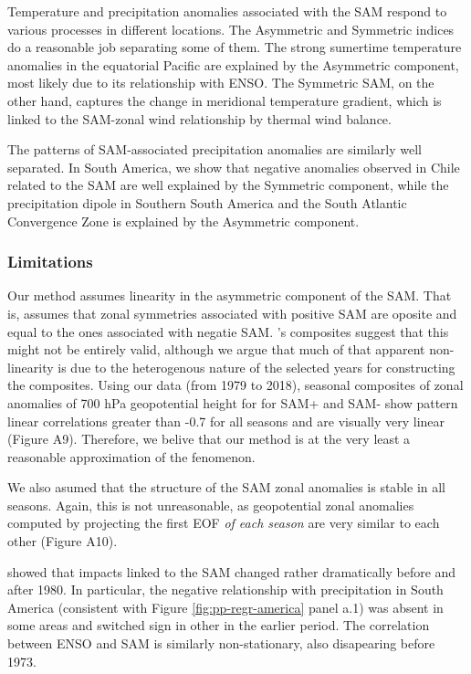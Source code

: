 \documentclass[]{ametsocV5}
\begin{document}
Temperature and precipitation anomalies associated with the SAM respond
to various processes in different locations. The Asymmetric and
Symmetric indices do a reasonable job separating some of them. The
strong sumertime temperature anomalies in the equatorial Pacific are
explained by the Asymmetric component, most likely due to its
relationship with ENSO. The Symmetric SAM, on the other hand, captures
the change in meridional temperature gradient, which is linked to the
SAM-zonal wind relationship by thermal wind balance.

The patterns of SAM-associated precipitation anomalies are similarly
well separated. In South America, we show that negative anomalies
observed in Chile related to the SAM are well explained by the Symmetric
component, while the precipitation dipole in Southern South America and
the South Atlantic Convergence Zone is explained by the Asymmetric
component.

\subsubsection*{Limitations}

Our method assumes linearity in the asymmetric component of the SAM.
That is, assumes that zonal symmetries associated with positive SAM are
oposite and equal to the ones associated with negatie SAM.
\citet{fogt2012}'s composites suggest that this might not be entirely
valid, although we argue that much of that apparent non-linearity is due
to the heterogenous nature of the selected years for constructing the
composites. Using our data (from 1979 to 2018), seasonal composites of
zonal anomalies of 700 hPa geopotential height for for SAM+ and SAM-
show pattern linear correlations greater than -0.7 for all seasons and
are visually very linear (Figure A9). Therefore, we belive that our
method is at the very least a reasonable approximation of the fenomenon.

We also asumed that the structure of the SAM zonal anomalies is stable
in all seasons. Again, this is not unreasonable, as geopotential zonal
anomalies computed by projecting the first EOF \emph{of each season} are
very similar to each other (Figure A10).

\citet{silvestri2009} showed that impacts linked to the SAM changed
rather dramatically before and after 1980. In particular, the negative
relationship with precipitation in South America (consistent with Figure
\ref{fig:pp-regr-america} panel a.1) was absent in some areas and
switched sign in other in the earlier period. The correlation between
ENSO and SAM is similarly non-stationary, also disapearing before 1973.
\end{document}
